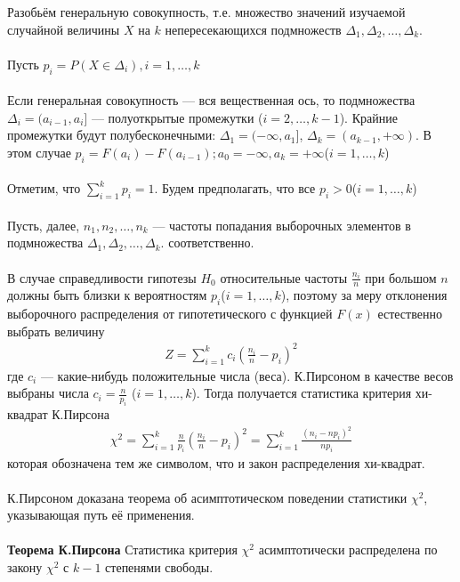 Разобьём генеральную совокупность, т.е. множество значений изучаемой случайной величины $X$ на $k$ непересекающихся подмножеств $\Delta_1,\Delta_2,\dots, \Delta_{k}.$\\ \\
Пусть $p_{i} = P(X \in \Delta_{i}), i = 1,\dots,k$ \\ \\
Если генеральная совокупность — вся вещественная ось,
то подмножества $\Delta_{i} = (a_{i-1}, a_i]$ — полуоткрытые промежутки ($i = 2,\dots,k-1$). Крайние промежутки будут полубесконечными: $\Delta_1 = (-\infty, a_1]$, 
$\Delta_{k} = (a_{k-1}, +\infty)$. В этом случае $p_{i} = F(a_i) - F(a_{i-1}); a_0 = -\infty, a_{k} = +\infty$($i = 1, \dots, k$) \\ \\
Отметим, что $\sum_{i=1}^{k}p_i = 1$. Будем предполагать, что все $p_i > 0$($i = 1, \dots, k$)\\ \\
Пусть, далее, $n_1, n_2, \dots, n_k$ — частоты попадания выборочных
элементов в подмножества  $\Delta_1,\Delta_2,\dots, \Delta_{k}.$ соответственно. \\ \\
В случае справедливости гипотезы $H_{0}$ относительные частоты $\frac{n_i}{n}$
при большом $n$ должны быть близки к вероятностям $p_i$($i = 1, \dots, k$),
поэтому за меру отклонения выборочного распределения от гипотетического с функцией $F(x)$  естественно выбрать величину
\begin{gather}
    Z = \sum_{i=1}^{k}{c_i(\frac{n_i}{n}-p_i)^2}
\end{gather}
где $c_i$ — какие-нибудь положительные числа (веса). К.Пирсоном в
качестве весов выбраны числа $c_i = \frac{n}{p_i}$ ($i = 1, \dots, k$). Тогда получается
статистика критерия хи-квадрат К.Пирсона
\begin{gather}
    \chi^2 = \sum_{i=1}^{k}{\frac{n}{p_i}(\frac{n_i}{n}-p_i)^2} = \sum_{i=1}^{k}{\frac{(n_i-np_i)^2}{np_i}}
\end{gather}
которая обозначена тем же символом, что и закон распределения
хи-квадрат.\\ \\ 
К.Пирсоном доказана теорема об асимптотическом поведении
статистики $\chi^2$, указывающая путь её применения.\\ \\ 
\textbf{Теорема К.Пирсона} Статистика критерия $\chi^2$ асимптотически распределена по закону $\chi^2$ с $k-1$ степенями свободы.\\ \\ 
